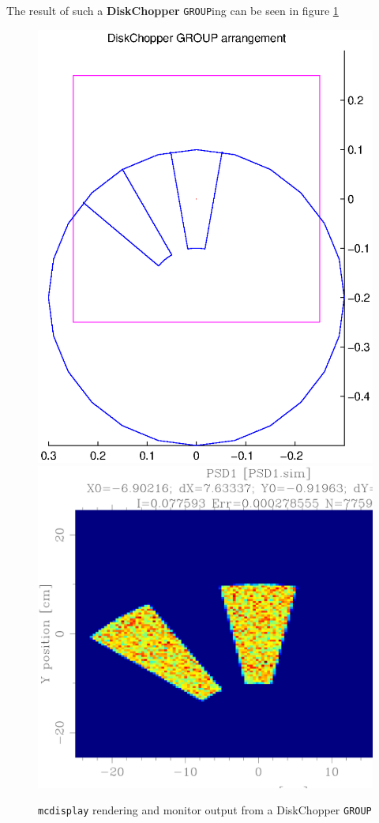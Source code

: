 The result of such a {\bf DiskChopper} \texttt{GROUP}ing can be seen in
figure \ref{f:chopper2}

\begin{figure}[ht]
\includegraphics[width=0.4\linewidth]{figures/DiskChopperGroup.ps}
\includegraphics[width=0.4\linewidth]{figures/DiskChopperPSD.eps}
\caption{\texttt{mcdisplay} rendering and monitor output from a DiskChopper \texttt{GROUP}}
\label{f:chopper2}
\end{figure}